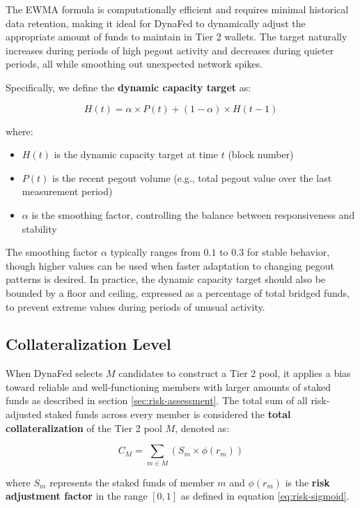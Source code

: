 The EWMA formula is computationally efficient and requires minimal historical data retention, making it ideal for DynaFed to dynamically adjust the appropriate amount of funds to maintain in Tier 2 wallets. The target naturally increases during periods of high pegout activity and decreases during quieter periods, all while smoothing out unexpected network spikes.

Specifically, we define the \textbf{dynamic capacity target} as:

\begin{equation}
    H(t) = \alpha \times P(t) + (1 - \alpha) \times H(t-1)
\end{equation}

where:
\begin{itemize}
    \item $H(t)$ is the dynamic capacity target at time $t$ (block number)
    \item $P(t)$ is the recent pegout volume (e.g., total pegout value over the last measurement period)
    \item $\alpha$ is the smoothing factor, controlling the balance between responsiveness and stability
\end{itemize}

The smoothing factor $\alpha$ typically ranges from $0.1$ to $0.3$ for stable behavior, though higher values can be used when faster adaptation to changing pegout patterns is desired. In practice, the dynamic capacity target should also be bounded by a floor and ceiling, expressed as a percentage of total bridged funds, to prevent extreme values during periods of unusual activity.

\subsection{Collateralization Level}
\label{sec:collateralization-level}

When DynaFed selects $M$ candidates to construct a Tier 2 pool, it applies a bias toward reliable and well-functioning members with larger amounts of staked funds as described in section \ref{sec:risk-assessment}. The total sum of all risk-adjusted staked funds across every member is considered the \textbf{total collateralization} of the Tier 2 pool $M$, denoted as:

\begin{equation}
    C_M = \sum_{m \in M} (S_m \times \phi(r_m))
\end{equation}

where $S_m$ represents the staked funds of member $m$ and $\phi(r_m)$ is the \textbf{risk adjustment factor} in the range $[0, 1]$ as defined in equation \ref{eq:risk-sigmoid}.

